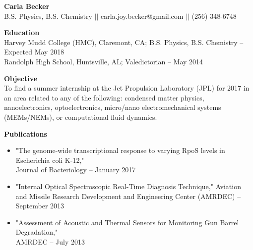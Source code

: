 \documentclass[9pt]{article}
\begin{document}
{\centering \Large \bf Carla Becker \\}
{\centering B.S. Physics, B.S. Chemistry $\vert \vert$ carla.joy.becker@gmail.com $\vert \vert$ (256) 348-6748 \\}

\noindent
{\bf Education \\}
Harvey Mudd College (HMC), Claremont, CA; B.S. Physics, B.S. Chemistry \--- Expected May 2018 \\
Randolph High School, Huntsville, AL; Valedictorian \--- May 2014 
\vspace{3mm}

\linespread{1}


\noindent
{\bf Objective \\}
To find a summer internship at the Jet Propulsion Laboratory (JPL) for 2017 in an area related to any of the following: condensed matter physics, nanoelectronics, optoelectronics, micro/nano electromechanical systems (MEMs/NEMs), or computational fluid dynamics.
\vspace{3mm}

\noindent
{\bf Publications \\}
\vspace{-8mm}
\begin{itemize}[leftmargin=3.75mm]
	\setlength{\itemsep}{0pt}
    \setlength{\parskip}{0pt}
    \setlength{\parsep}{0pt}
\item "The genome-wide transcriptional response to varying RpoS levels in Escherichia coli K-12," \\ Journal of Bacteriology \--- January 2017
\item "Internal Optical Spectroscopic Real-Time Diagnosis Technique,"  Aviation and Missile Research Development and Engineering Center (AMRDEC) \--- September 2013
\item "Assessment of Acoustic and Thermal Sensors for Monitoring Gun Barrel Degradation," \\ AMRDEC \--- July 2013
\end{itemize}
\end{document}
